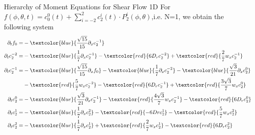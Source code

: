 \begin{frame}{Hierarchy of Moment Equations for Shear Flow 1D}
	\scriptsize
	For  $f(\phi, \theta, t) = c^0_0(t) + \sum_{i=-2}^{2} c^i_{2}(t) \cdot P^i_{2}(\phi, \theta)$,i.e. N=1, we obtain the following system
	\begin{align*}
		\partial_{t} f_0 = &-\textcolor{blue}{\frac{\sqrt{15}}{15}\partial_x c^{-1}_2}\\
		\partial_{t} c^{-2}_2 = &-\textcolor{blue}{\frac{1}{7} \partial_x c^{-1}_2} -\textcolor{red}{6D_rc^{-2}_2}+ \textcolor{red}{\frac{2}{7}w_xc^{-1}_2} \\
		\partial_{t} c^{-1}_2 = &-\textcolor{blue}{\frac{\sqrt{15}}{15}\partial_x f_0} - \textcolor{blue}{\frac{1}{7} \partial_x c^{-2}_2} - \textcolor{blue}{\frac{\sqrt{3}}{21}\partial_x c^0_2} \\ &-\textcolor{red}{\frac{5}{7}w_x c^{-2}_2} -\textcolor{red}{6D_r c^{-1}_2} +\textcolor{red}{\frac{3\sqrt{3}}{7}w_x c^0_2} \\
		\partial_{t} c^0_2 = &-\textcolor{blue}{\frac{\sqrt{3}}{21}\partial_x c^{-1}_2} -\textcolor{red}{\frac{4\sqrt{3}}{7}w_x c^{-1}_2} -\textcolor{red}{6D_r c^0_2} \\
		\partial_{t} c^1_2 = &-\textcolor{blue}{\frac{1}{7}\partial_x c^2_2} -\textcolor{red}{-6Dr c^{1}_2} -\textcolor{red}{\frac{5}{7}w_x c^{2}_2}\\
		\partial_{t} c^2_2 = &-\textcolor{blue}{\frac{1}{7}\partial_x c^1_2} +\textcolor{red}{\frac{2}{7}w_x c^{1}_2} -\textcolor{red}{6D_r c^{2}_2}
	\end{align*}
\end{frame}
